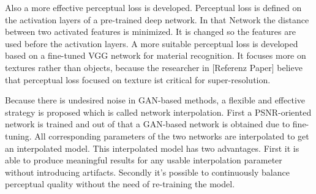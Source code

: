 Also a more effective perceptual loss is developed. Perceptual loss is defined on the activation layers of a pre-trained deep network. In that Network the distance between two activated features is minimized. It is changed so the features are used before the activation layers. A more suitable perceptual loss is developed based on a fine-tuned VGG network for material recognition. It focuses more on textures rather than objects, because the researcher in [Referenz Paper] believe that perceptual loss focused on texture ist critical for super-resolution.

Because there is undesired noise in GAN-based methods, a flexible and effective strategy is proposed which is called network interpolation. First a PSNR-oriented network is trained and out of that a GAN-based network is obtained due to fine-tuning. All corresponding parameters of the two networks are interpolated to get an interpolated model. This interpolated model has two advantages. First it is able to produce meaningful results for any usable interpolation parameter without introducing artifacts. Secondly it's possible to continuously balance perceptual quality without the need of re-training the model.



